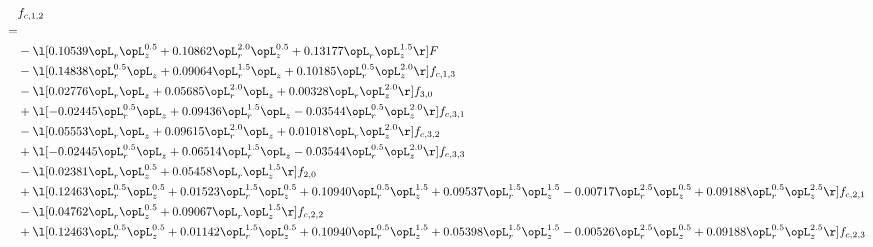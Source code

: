 \begin{alignat}{2} 
\label{eq:f_12_2} 
& f_{c,1,2} \nonumber \\ 
 = \\ 
& - \l[  0.10539 \opL_r \opL_z^{0.5} +  0.10862 \opL_r^{2.0} \opL_z^{0.5} +  0.13177 \opL_r \opL_z^{1.5}  \r] F \nonumber \\ 
& - \l[  0.14838 \opL_r^{0.5} \opL_z +  0.09064 \opL_r^{1.5} \opL_z +  0.10185 \opL_r^{0.5} \opL_z^{2.0}  \r] f_{c,1,3} \nonumber \\ 
& - \l[  0.02776 \opL_r \opL_z +  0.05685 \opL_r^{2.0} \opL_z +  0.00328 \opL_r \opL_z^{2.0}  \r] f_{3,0} \nonumber \\ 
& + \l[  -0.02445 \opL_r^{0.5} \opL_z +  0.09436 \opL_r^{1.5} \opL_z   -0.03544 \opL_r^{0.5} \opL_z^{2.0}  \r] f_{c,3,1} \nonumber \\ 
& - \l[  0.05553 \opL_r \opL_z +  0.09615 \opL_r^{2.0} \opL_z +  0.01018 \opL_r \opL_z^{2.0}  \r] f_{c,3,2} \nonumber \\ 
& + \l[  -0.02445 \opL_r^{0.5} \opL_z +  0.06514 \opL_r^{1.5} \opL_z   -0.03544 \opL_r^{0.5} \opL_z^{2.0}  \r] f_{c,3,3} \nonumber \\ 
& - \l[  0.02381 \opL_r \opL_z^{0.5} +  0.05458 \opL_r \opL_z^{1.5}  \r] f_{2,0} \nonumber \\ 
& + \l[  0.12463 \opL_r^{0.5} \opL_z^{0.5} +  0.01523 \opL_r^{1.5} \opL_z^{0.5} +  0.10940 \opL_r^{0.5} \opL_z^{1.5} +  0.09537 \opL_r^{1.5} \opL_z^{1.5}   -0.00717 \opL_r^{2.5} \opL_z^{0.5} +  0.09188 \opL_r^{0.5} \opL_z^{2.5}  \r] f_{c,2,1} \nonumber \\ 
& - \l[  0.04762 \opL_r \opL_z^{0.5} +  0.09067 \opL_r \opL_z^{1.5}  \r] f_{c,2,2} \nonumber \\ 
& + \l[  0.12463 \opL_r^{0.5} \opL_z^{0.5} +  0.01142 \opL_r^{1.5} \opL_z^{0.5} +  0.10940 \opL_r^{0.5} \opL_z^{1.5} +  0.05398 \opL_r^{1.5} \opL_z^{1.5}   -0.00526 \opL_r^{2.5} \opL_z^{0.5} +  0.09188 \opL_r^{0.5} \opL_z^{2.5}  \r] f_{c,2,3} \nonumber \\ 
\end{alignat} 


